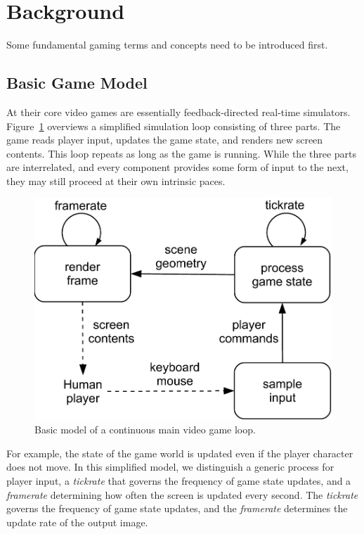 \section{Background}
\label{sec:background}

Some fundamental gaming terms and concepts need to be introduced first.


\subsection{Basic Game Model}
\label{subsec:game-model}

At their core video games are essentially feedback-directed real-time simulators. Figure~\ref{fig:gameloop1} overviews a simplified simulation loop consisting of three parts. The game reads player input, updates the game state, and renders new screen contents. This loop repeats as long as the game is running. While the three parts are interrelated, and every component provides some form of input to the next, they may still proceed at their own intrinsic paces.


\begin{figure}[!t]
	\centering
	\includegraphics[width=0.8\columnwidth]{../../../models/game_loop.pdf}
	\caption{Basic model of a continuous main video game loop.}
	\label{fig:gameloop1}
\end{figure}

For example, the state of the game world is updated even if the player character does not move. In this simplified model, we distinguish a generic process for player input, a \textit{tickrate} that governs the frequency of game state updates, and a \textit{framerate} determining how often the screen is updated every second. The \textit{tickrate} governs the frequency of game state updates, and the \textit{framerate} determines the update rate of the output image.

